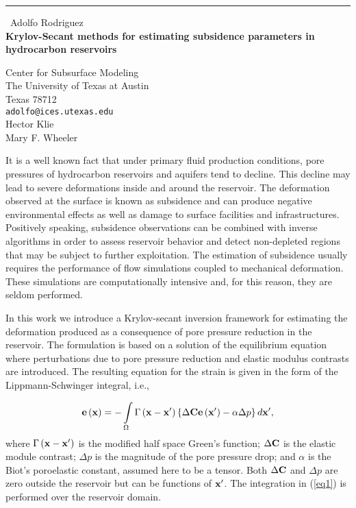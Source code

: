 \documentclass{report}
\begin{document}
\begin{center}
\rule{6in}{1pt} \
{\large Adolfo Rodriguez \\
{\bf Krylov-Secant methods for estimating subsidence parameters in hydrocarbon reservoirs}}

Center for Subsurface Modeling \\ The University of Texas at Austin \\ Texas 78712
\\
{\tt adolfo@ices.utexas.edu}\\
Hector Klie\\
Mary F. Wheeler\end{center}

It is a well known fact that under primary fluid production
conditions, pore pressures of hydrocarbon reservoirs and aquifers
tend to decline. This decline may lead to severe deformations
inside and around the reservoir. The deformation observed at the
surface is known as subsidence and can produce negative
environmental effects as well as damage to surface facilities and
infrastructures. Positively speaking, subsidence observations can
be combined with inverse algorithms in order to assess reservoir
behavior and detect non-depleted regions that may be subject to
further exploitation. The estimation of subsidence usually
requires the performance of flow simulations coupled to mechanical
deformation. These simulations are computationally intensive and,
for this reason, they are seldom performed.

In this work we introduce a Krylov-secant inversion framework for
estimating the deformation produced as a consequence of pore
pressure reduction in the reservoir. The formulation is based on
a solution of the equilibrium equation where perturbations due to
pore pressure reduction and elastic modulus contrasts are
introduced. The resulting equation for the strain is given in the
form of the Lippmann-Schwinger integral, i.e.,

\begin{equation}
{\bf{e}}\left( {\bf{x}} \right) = - \int\limits_\Omega {\Gamma
\left( {{\bf{x - x'}}} \right)} \left\{ {\Delta {\bf{Ce}}\left(
{{\bf{x'}}} \right) - {\bf{\alpha }}\Delta p} \right\}d{\bf{x'}},
\label{eq1}
\end{equation}
where $\Gamma \left( {{\bf{x - x'}}} \right)$ is the modified half
space Green's function; $\Delta\bf{C}$ is the elastic module
contrast; $\Delta p$ is the magnitude of the pore pressure drop;
and $\alpha$ is the Biot's poroelastic constant, assumed here to
be a tensor. Both $\Delta\bf{C}$ and $\Delta p$ are zero outside
the reservoir but can be functions of $\bf{x'}$. The integration
in (\ref{eq1}) is performed over the reservoir domain.
\end{document}
